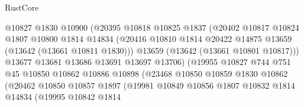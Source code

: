 \begin{lexlean}{RustCore}
\begin{coremodule}
                                  @10827
                                  @1830
                                  @10900
                                  (@20395
                                    @10818
                                    @10825
                                    @1837
                                    (@20402
                                      @10817
                                      @10824
                                      @1807
                                      @10800
                                      @1814
                                      @14834
                                      (@20416
                                        @10810
                                        @1814
                                        @20422
                                        @14875
                                        @13659
                                        (@13642 (@13661 @10811 @1830)))
                                      @13659
                                      (@13642 (@13661 @10801 @10817)))
                                    @13677
                                    @13681
                                    @13686
                                    @13691
                                    @13697
                                    @13706)
                                  (@19955
                                    @10827
                                    @744
                                    @751
                                    @45
                                    @10850
                                    @10862
                                    @10886
                                    @10898
                                    (@23468
                                      @10850
                                      @10859
                                      @1830
                                      @10862
                                      (@20462
                                        @10850
                                        @10857
                                        @1897
                                        (@19981
                                          @10849
                                          @10856
                                          @1807
                                          @10832
                                          @1814
                                          @14834
                                          (@19995
                                            @10842
                                            @1814

\end{coremodule}
\end{lexlean}
